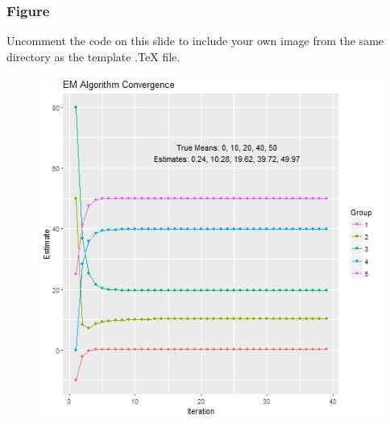 \documentclass{beamer}
\begin{document}
\begin{frame}
\frametitle{Figure}
Uncomment the code on this slide to include your own image from the same directory as the template .TeX file.
\begin{figure}
\includegraphics[width=0.8\linewidth]{EMconvergence-wonky}
\end{figure}
\end{frame}

\end{document}
